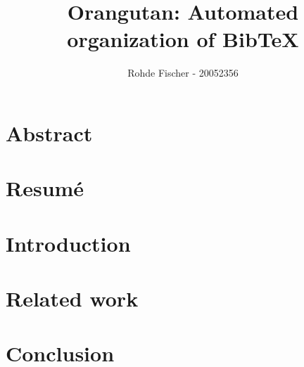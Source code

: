 \documentclass[twoside,11pt,openright,a4paper]{report}
\begin{document}
\author{Rohde Fischer - 20052356}
\title{Orangutan: Automated organization of Bib\TeX}

\pagestyle{empty}
\maketitle


\pagestyle{plain}
\setcounter{page}{1}

\chapter*{Abstract}


\chapter*{Resum\'e}


%
%
%
\tableofcontents
{}
\setcounter{secnumdepth}{2}


\chapter{Introduction}
\label{ch:intro}




\chapter{Related work}
\label{ch:related}




\chapter{Conclusion}
\label{ch:conclusion}

\todo{\dots}


\printbibliography
\end{document}
